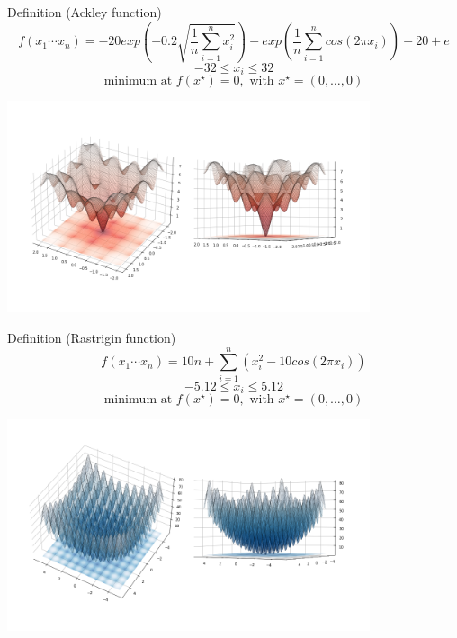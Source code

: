 \documentclass{beamer}
\newcommand{\backupend}{
   \addtocounter{framenumberappendix}{-\value{framenumber}}
   \addtocounter{framenumber}{\value{framenumberappendix}}
}
\begin{document}
\begin{frame}
  \begin{block}{Definition (Ackley function)}
    $$f(x_1 \cdots x_n) = -20 exp(-0.2 \sqrt{\frac{1}{n} \sum_{i=1}^n x_i^2}) - exp(\frac{1}{n} \sum_{i=1}^n cos(2\pi x_i)) + 20 + e$$
    $$-32 \leq x_i \leq 32$$
    $$\text{minimum at } f(x^{\star}) = 0, \text{ with } x^{\star} = (0, \dots, 0)$$
  \end{block}
  \centering
  \includegraphics[width=0.8\textwidth]{figures/introduction-ackley}
\end{frame}
\begin{frame}
  \begin{block}{Definition (Rastrigin function)}
    $$f(x_1 \cdots x_n) = 10n + \sum_{i=1}^n (x_i^2 -10cos(2\pi x_i))$$
    $$-5.12 \leq x_i \leq 5.12$$
    $$\text{minimum at } f(x^{\star}) = 0, \text{ with } x^{\star} = (0, \dots, 0)$$
  \end{block}
  \centering
  \includegraphics[width=0.8\textwidth]{figures/introduction-rastrigin}
\end{frame}
\backupend
\end{document}
